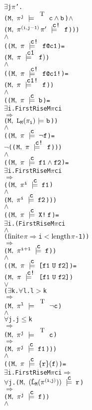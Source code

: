 \documentclass{llncs}
\makeatletter
\newcommand{\And}{\(\wedge\)}
\newcommand{\Or}{\(\vee\)}
\newcommand{\Imp}{\(\Rightarrow\)}
\newcommand{\Not}{\(\neg\)}
\newcommand{\Forall}{\(\forall\)}
\newcommand{\Exists}{\(\exists\)}
\newcommand{\IsFinitePath}{\({\rm{finite}}\)}
\newcommand{\PathLength}{\({\rm{length}}\)}
\newcommand{\pathCat}[2]{#1\hspace*{0.5mm}#2}
\newcommand{\Leq}{\(\leq\)}
\newcommand{\Le}{\(<\)}
\newcommand{\Ge}{\(>\)}
\newcommand{\T}{\texttt{\small\rm{T}}}
\renewcommand{\Pi}{\(\pi\)}
\newcommand{\BSem}[3]{(\(\tt#1,~#2~{\models}~#3\))}
\newcommand{\SSem}[4]{(\(\tt{#1,~#2~\models^{\hspace*{-2.3mm}\raisebox{1mm}{\tt#3}}~#4}\))}
\newcommand{\FSem}[4]{(\(\tt{#1,~#2~\models^{\hspace*{-2.3mm}\raisebox{1mm}{\tt#3}}~#4}\))}
\newcommand{\FBool}[1]{#1}
\newcommand{\bNot}[1]{\neg#1}
\newcommand{\fNot}[1]{\neg#1}
\newcommand{\weakClock}[1]{#1}
\newcommand{\strongClock}[1]{#1!}
\newcommand{\restN}[2]{#1^{#2}}
\newcommand{\pathEl}[2]{#1_{#2}}
\newcommand{\pathSeg}[2]{#1^{#2}}
\newcommand{\lHat}[1]{\hat{\texttt{L}}_{#1}}
\newcommand{\lNoHat}[1]{{\texttt{L}}_{#1}}
\newcommand{\bAnd}[2]{#1\wedge#2}
\newcommand{\fAnd}[2]{#1 \wedge #2}
\newcommand{\fNext}[1]{\texttt{X!}\hspace*{0.8mm}#1}
\newcommand{\fUntil}[2]{\texttt{[}#1~\texttt{U}~#2\texttt{]}}
\newcommand{\fSuffixImp}[2]{\{#1\}(#2)}
\newcommand{\fWeakClock}[2]{#1\texttt{@}#2}
\newcommand{\fStrongClock}[2]{#1\texttt{@}#2\texttt{!}}
\makeatother
\begin{document}
\begin{alltt}
           {\Exists}j {\Pi}'. 
             {\FSem{M}{\restN{{\pi}}{j}}{\weakClock{\T}}{{\FBool{\bAnd{c}{b}}}}} {\And} 
             {\FSem{M}{\pathCat{\pathSeg{\pi}{(i,j-1)}}{{\pi}'}}{{\strongClock{c}}}{f}}))
    {\And}
    ({\FSem{M}{{\pi}}{{\strongClock{c}}}{\fWeakClock{f}{c1}}} =   
      {\FSem{M}{{\pi}}{{\weakClock{c1}}}{f)}}
    {\And}
    ({\FSem{M}{{\pi}}{{\strongClock{c}}}{\fStrongClock{f}{c1}}} =   
      {\FSem{M}{{\pi}}{{\strongClock{c1}}}{f}})
    {\And}
    ({\FSem{M}{{\pi}}{{\weakClock{c}}}{{\FBool{b}}}} = 
      {\Exists}i. FirstRise M {\Pi} c i 
          {\Imp} 
          {\BSem{M}{\lNoHat{M}(\pathEl{{\pi}}{i})}{b}})
    {\And}
    ({\FSem{M}{{\pi}}{{\weakClock{c}}}{\fNot{f}}} = 
      {\Not}({\FSem{M}{{\pi}}{{\strongClock{c}}}{f}})) 
    {\And}
    ({\FSem{M}{{\pi}}{{\weakClock{c}}}{\fAnd{f1}{f2}}} = 
      {\Exists}i. FirstRise M {\Pi} c i
          {\Imp}
          ({\FSem{M}{\restN{{\pi}}{i}}{{\weakClock{c}}}{f1}} 
           {\And}
           {\FSem{M}{\restN{{\pi}}{i}}{{\weakClock{c}}}{f2}}))
    {\And}
    ({\FSem{M}{{\pi}}{{\weakClock{c}}}{\fNext{f}}} = 
      {\Exists}i. (FirstRise M {\Pi} c i 
           {\And}
           ({\IsFinitePath} {\Pi} {\Imp} i {\Le} \PathLength {\Pi} - 1))
           {\Imp}
           {\FSem{M}{\restN{{\pi}}{i+1}}{{\weakClock{c}}}{f}})
    {\And}
    ({\FSem{M}{{\pi}}{{\weakClock{c}}}{\fUntil{f1}{f2}}} = 
      {\FSem{M}{{\pi}}{{\strongClock{c}}}{\fUntil{f1}{f2}}}  
      {\Or}
      ({\Exists}k. {\Forall}l. l {\Ge} k
               {\Imp}
               {\FSem{M}{\restN{{\pi}}{l}}{\weakClock{\T}}{{\FBool{\bNot{c}}}}} 
               {\And} 
               {\Forall}j. j {\Leq} k 
                   {\Imp}
                   {\FSem{M}{\restN{{\pi}}{j}}{\weakClock{\T}}{{\FBool{c}}}}
                   {\Imp}
                   {\FSem{M}{\restN{{\pi}}{j}}{{\weakClock{c}}}{f1}}))
    {\And}
    ({\FSem{M}{{\pi}}{{\weakClock{c}}}{\fSuffixImp{r}{f}}} = 
      {\Exists}i. FirstRise M {\Pi} c i {\Imp}
          {\Forall}j. \SSem{M}{(\lHat{M} (\pathSeg{\pi}{(i,j)}))}{c}{r}
              {\Imp}
              {\FSem{M}{\restN{{\pi}}{j}}{{\weakClock{c}}}{f}})
    {\And}


\end{alltt}
\end{document}
